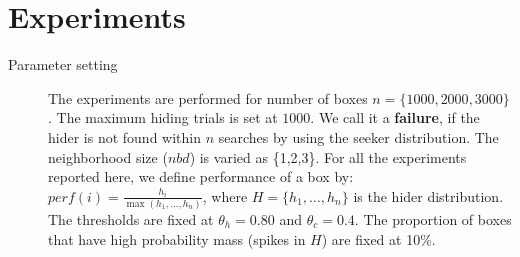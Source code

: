 \documentclass[11pt,a4paper,draft]{article}
\begin{document}
\section{Experiments} \label{base_expt}

\begin{description}
	\item[Parameter setting] The experiments are performed for number of boxes $n = \{1000, 2000, 3000\}$. The maximum hiding trials is set at $1000$. We call it a \textbf{failure}, if the hider is not found within $n$ searches by using the seeker distribution. The neighborhood size ($nbd$) is varied as \{1,2,3\}. For all the experiments reported here, we define performance of a box by: $perf(i) = \frac{h_i}{\max(h_1,\ldots, h_n)}$, where $H = \{h_1,\ldots, h_n\}$ is the hider distribution. The thresholds are fixed at $\theta_h = 0.80$ and $\theta_c = 0.4$. The proportion of boxes that have high probability mass (spikes in $H$) are fixed at 10\%.
	\label{setting:base}


\end{description}
\end{document}
